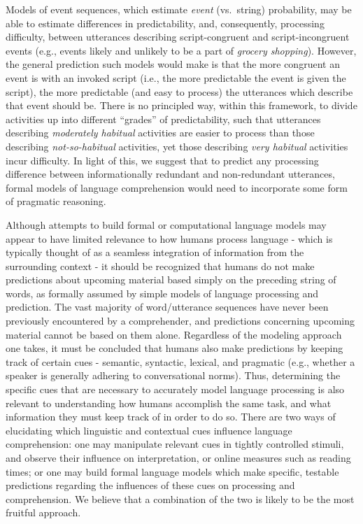 Models of event sequences, which estimate \emph{event} (vs.~string)
probability, may be able to estimate differences in predictability, and,
consequently, processing difficulty, between utterances describing
script-congruent and script-incongruent events (e.g., events likely and
unlikely to be a part of \emph{grocery shopping}). However, the general
prediction such models would make is that the more congruent an event is
with an invoked script (i.e., the more predictable the event is given
the script), the more predictable (and easy to process) the utterances
which describe that event should be. There is no principled way, within
this framework, to divide activities up into different \enquote{grades}
of predictability, such that utterances describing \emph{moderately
habitual} activities are easier to process than those describing
\emph{not-so-habitual} activities, yet those describing \emph{very
habitual} activities incur difficulty. In light of this, we suggest that
to predict any processing difference between informationally redundant
and non-redundant utterances, formal models of language comprehension
would need to incorporate some form of pragmatic reasoning.

Although attempts to build formal or computational language models may
appear to have limited relevance to how humans process language - which
is typically thought of as a seamless integration of information from
the surrounding context - it should be recognized that humans do not
make predictions about upcoming material based simply on the preceding
string of words, as formally assumed by simple models of language
processing and prediction. The vast majority of word/utterance sequences
have never been previously encountered by a comprehender, and
predictions concerning upcoming material cannot be based on them alone.
Regardless of the modeling approach one takes, it must be concluded that
humans also make predictions by keeping track of certain cues -
semantic, syntactic, lexical, and pragmatic (e.g., whether a speaker is
generally adhering to conversational norms). Thus, determining the
specific cues that are necessary to accurately model language processing
is also relevant to understanding how humans accomplish the same task,
and what information they must keep track of in order to do so. There
are two ways of elucidating which linguistic and contextual cues
influence language comprehension: one may manipulate relevant cues in
tightly controlled stimuli, and observe their influence on
interpretation, or online measures such as reading times; or one may
build formal language models which make specific, testable predictions
regarding the influences of these cues on processing and comprehension.
We believe that a combination of the two is likely to be the most
fruitful approach.

